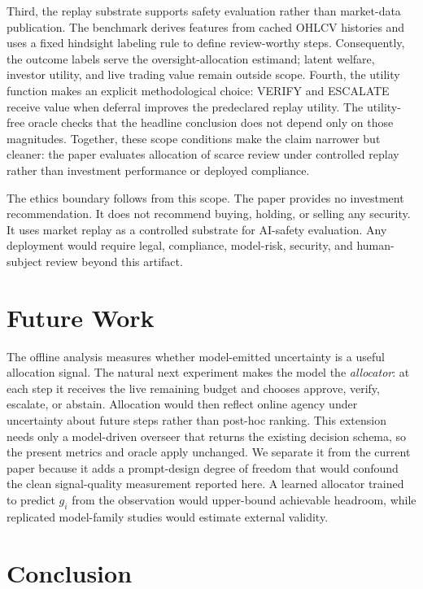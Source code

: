 \documentclass[10pt,twocolumn]{article}
\begin{document}
Third, the replay substrate supports safety evaluation rather than market-data publication. The benchmark derives features from cached OHLCV histories and uses a fixed hindsight labeling rule to define review-worthy steps. Consequently, the outcome labels serve the oversight-allocation estimand; latent welfare, investor utility, and live trading value remain outside scope. Fourth, the utility function makes an explicit methodological choice: VERIFY and ESCALATE receive value when deferral improves the predeclared replay utility. The utility-free oracle checks that the headline conclusion does not depend only on those magnitudes. Together, these scope conditions make the claim narrower but cleaner: the paper evaluates allocation of scarce review under controlled replay rather than investment performance or deployed compliance.

The ethics boundary follows from this scope. The paper provides no investment recommendation. It does not recommend buying, holding, or selling any security. It uses market replay as a controlled substrate for AI-safety evaluation. Any deployment would require legal, compliance, model-risk, security, and human-subject review beyond this artifact.

\section{Future Work}
\label{sec:future}

The offline analysis measures whether model-emitted uncertainty is a useful allocation signal. The natural next experiment makes the model the \emph{allocator}: at each step it receives the live remaining budget and chooses approve, verify, escalate, or abstain. Allocation would then reflect online agency under uncertainty about future steps rather than post-hoc ranking. This extension needs only a model-driven overseer that returns the existing decision schema, so the present metrics and oracle apply unchanged. We separate it from the current paper because it adds a prompt-design degree of freedom that would confound the clean signal-quality measurement reported here. A learned allocator trained to predict \(g_i\) from the observation would upper-bound achievable headroom, while replicated model-family studies would estimate external validity.

\section{Conclusion}
\end{document}
